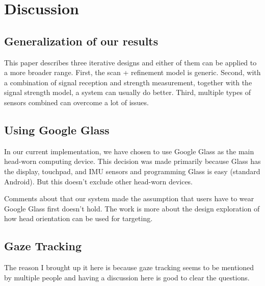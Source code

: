 \section{Discussion}
\label{sec:discussion}


\subsection{Generalization of our results}
\label{sec:gener-our-results}
This paper describes three iterative designs and either of them can be applied to a more broader range. First, the scan + refinement model is generic. Second, with a combination of signal reception and strength measurement, together with the signal strength model, a system can usually do better. Third, multiple types of sensors combined can overcome a lot of issues. 

\subsection{Using Google Glass}
\label{sec:using-google-glass}
In our current implementation, we have chosen to use Google Glass as the main head-worn computing device. This decision was made primarily because Glass has the display, touchpad, and IMU sensors and programming Glass is easy (standard Android). But this doesn't exclude other head-worn devices. 

Comments about that our system made the assumption that users have to wear Google Glass first doesn't hold. The work is more about the design exploration of how head orientation can be used for targeting. 

\subsection{Gaze Tracking}
\label{sec:gaze-tracking}
The reason I brought up it here is because gaze tracking seems to be mentioned by multiple people and having a discussion here is good to clear the questions.




